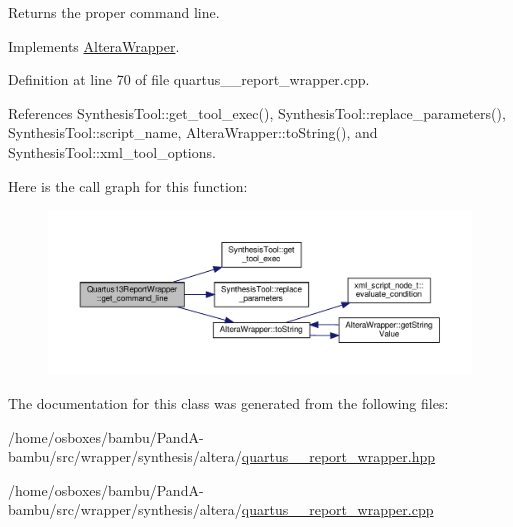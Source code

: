Returns the proper command line. 



Implements \hyperlink{classAlteraWrapper_a1b6c44694f0bd28b6f458245fd373326}{Altera\+Wrapper}.



Definition at line 70 of file quartus\+\_\+\_\+report\+\_\+wrapper.\+cpp.



References Synthesis\+Tool\+::get\+\_\+tool\+\_\+exec(), Synthesis\+Tool\+::replace\+\_\+parameters(), Synthesis\+Tool\+::script\+\_\+name, Altera\+Wrapper\+::to\+String(), and Synthesis\+Tool\+::xml\+\_\+tool\+\_\+options.

Here is the call graph for this function\+:
\nopagebreak
\begin{figure}[H]
\begin{center}
\leavevmode
\includegraphics[width=350pt]{d5/d0a/classQuartus13ReportWrapper_a3497e8b5f3941355beb7c64ee771b5ff_cgraph}
\end{center}
\end{figure}


The documentation for this class was generated from the following files\+:\begin{DoxyCompactItemize}
\item 
/home/osboxes/bambu/\+Pand\+A-\/bambu/src/wrapper/synthesis/altera/\hyperlink{quartus__13__report__wrapper_8hpp}{quartus\+\_\+\_\+report\+\_\+wrapper.\+hpp}\item 
/home/osboxes/bambu/\+Pand\+A-\/bambu/src/wrapper/synthesis/altera/\hyperlink{quartus__13__report__wrapper_8cpp}{quartus\+\_\+\_\+report\+\_\+wrapper.\+cpp}\end{DoxyCompactItemize}
